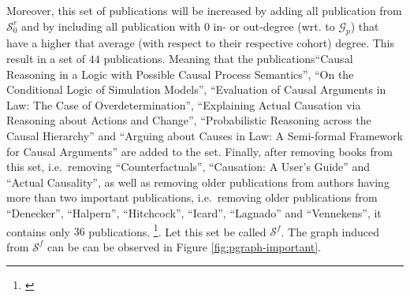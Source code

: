 \documentclass[11pt,a4paper]{book}
\theoremstyle{definition}
\theoremstyle{definition}
\theoremstyle{definition}
\theoremstyle{remark}
\newcommand{\psetz}{S_{\mathit{0}}}
\newcommand{\fxset}{\mathcal{S}^f}
\newcommand{\xsetz}{\mathcal{S}_{\mathit{0}}}
\newcommand{\pgraph}{\mathcal{G}_{p}}
\begin{document}
Moreover, this set of publications will be increased by adding all publication from $\xsetz^r$ and by including all publication with $0$ in- or out-degree (wrt. to $\pgraph$) that have a higher that average (with respect to their respective cohort) degree.
%
%
This result in a set of $44$ publications. Meaning that the publications``Causal Reasoning in a Logic with Possible Causal Process Semantics'', ``On the Conditional Logic of Simulation Models'', ``Evaluation of Causal Arguments in Law: The Case of Overdetermination'', ``Explaining Actual Causation via Reasoning about Actions and Change'', ``Probabilistic Reasoning across the Causal Hierarchy'' and ``Arguing about Causes in Law: A Semi-formal Framework for Causal Arguments'' are added to the set.
Finally, after removing books from this set, i.e.\ removing  ``Counterfactuals'',  ``Causation: A User's Guide'' and ``Actual Causality'', as well as removing older publications from authors having more than two important publications, i.e.\ removing older publications from ``Denecker'', ``Halpern'', ``Hitchcock'', ``Icard'', ``Lagnado'' and ``Vennekens'',  it contains only $36$ publications.
\footnote{\parencite{vennekens2010embracing,
bex2010hybrid,
lee2010representing,
lifschitz2010translating,
glymour2010actual,
claassen2010causal,
gerstenberg2010spreading,
halpern2011actual,
shulz2011if,
briggs2012interventionist,
baumgartner2013regularity,
hyttinen2013discovering,
halpern2015graded,
weslake2015partial,
chockler2015causal,
beckers2016general,
schaffer2016grounding,
halpern2016appropriate,
blanchard2017cause,
wright2017ness,
icard2017normality,
aleksandrowicz2017computational,
fenton2017proposed,
lagnado2017causation,
bochman2018actual,
ibeling2018conditional,
beckers2018principled,
bochman2018laws,
denecker2018causal,
batusov2018situation,
denecker2019explaining,
liepicna2019evaluation,
leblanc2019explaining,
liepicna2020arguing,
khannecessary,
ibeling2020probabilistic}}. 
Let this set be called $\fxset$.
The graph induced from $\fxset$ can be can be observed in Figure \ref{fig:pgraph-important}.
\end{document}
